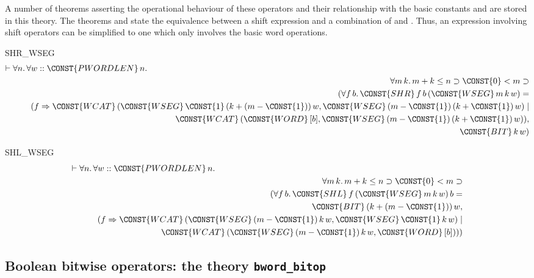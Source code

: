 A number of theorems asserting the operational behaviour of
these operators and their relationship with the basic constants
 and  are stored in this theory. The theorems
 and  state the equivalence between a
shift expression and a combination of  and .
Thus, an expression involving shift operators can be simplified to one
which only involves the basic word operations.
\begin{holthm}{SHR_WSEG}
\begin{eqnarray*}
\lefteqn{\THM \FORALL n\DOT \FORALL w ::\CONST{PWORDLEN} \,n\DOT} \\
 & & {}\FORALL m \,k\DOT
                     m + k \LEE  n \IMP \CONST{0} \LES  m \IMP \\
 & & \quad (\FORALL f \,b \DOT\CONST{SHR} \,f \,b \,(\CONST{WSEG} \,m \,k \,w) =\\
 & & \qquad (f \Rightarrow
        \CONST{WCAT} \,(\CONST{WSEG} \,\CONST{1} \,(k + (m - \CONST{1})) \,w,
                        \CONST{WSEG} \,(m - \CONST{1}) \,(k + \CONST{1}) \,w) \mid \\
 & & \qquad \qquad \CONST{WCAT} \,(\CONST{WORD} \,[b], \CONST{WSEG} \,(m - \CONST{1}) \,(k + \CONST{1}) \,w)),\\
 & & \qquad \CONST{BIT} \,k \,w)
\end{eqnarray*}
\end{holthm}
\begin{holthm}{SHL_WSEG}
\begin{eqnarray*}
\lefteqn{\THM \FORALL n\DOT \FORALL w :: \CONST{PWORDLEN} \,n\DOT}\\
 & & {}\FORALL m \,k\DOT
        m + k \LEE  n \IMP \CONST{0} \LES  m \IMP \\
 & & \quad (\FORALL f \,b \DOT\CONST{SHL} \,f \,(\CONST{WSEG} \,m \,k \,w) \,b = \\
 & & \qquad \CONST{BIT} \,(k + (m - \CONST{1})) \,w,\\
 & & \qquad (f \Rightarrow
        \CONST{WCAT} \,(\CONST{WSEG} \,(m - \CONST{1}) \,k \,w,
                        \CONST{WSEG} \,\CONST{1} \,k \,w) \mid \\
 & & \qquad \qquad \CONST{WCAT} \,(\CONST{WSEG} \,(m - \CONST{1}) \,k \,w,
                                       \CONST{WORD} \,[b])))
\end{eqnarray*}
\end{holthm}

\subsection{Boolean bitwise operators: the theory {\tt bword\_bitop}}

